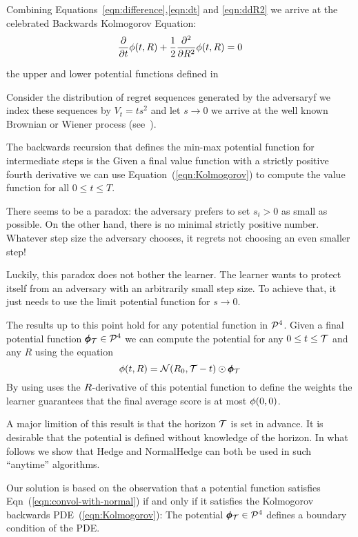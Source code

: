 \documentclass{article}[12pt]
\begin{document}
Combining Equations~\ref{eqn:difference},\ref{eqn:dt} and \ref{eqn:ddR2} we arrive at the  
 celebrated Backwards Kolmogorov Equation:
\begin{equation} \label{eqn:Kolmogorov}
  \frac{\partial}{\partial t} \phi(t,R)
  + \frac{1}{2} \frac{\partial^2}{\partial R^2} \phi(t,R)=0
\end{equation}

the upper and lower
potential functions defined in

Consider the distribution of regret sequences generated by the adversaryf we index these sequences by $V_t = ts^2$ and let $s \to 0$ we arrive at the well known Brownian or Wiener process
(see~\cite{kac1947random}).

The backwards recursion that defines the min-max potential function
for intermediate steps is the 
Given a final value function with a strictly positive fourth
derivative we can use Equation~(\ref{eqn:Kolmogorov}) to compute the
value function for all $0 \leq t \leq T$. 

There seems to be a paradox: the adversary prefers to set $s_i>0$ as
small as possible. On the other hand, there is no minimal strictly
positive number. Whatever step size the adversary chooses, it regrets
not choosing an even smaller step!

Luckily, this paradox does not bother the learner. The learner wants
to protect itself from an adversary with an arbitrarily small step
size. To achieve that, it just needs to use the limit potential function for $s \to 0$.

The results up to this point hold for any potential function in
${\cal P}^{4}$. Given a final potential function $\pmb{\phi}_{\mathcal{T}} \in {\cal P}^{4}$ we
can compute the potential for any $0 \leq t \leq \mathcal{T}$ and any $R$ using the equation 
\begin{equation} \label{eqn:convol-with-normal}
\phi(t,R)={\cal N}(R_0,\mathcal{T}-t) \odot \pmb{\phi}_{\mathcal{T}}
\end{equation}
By using uses the $R$-derivative of this potential function to define
the weights the learner guarantees that the final average score is at
most $\phi(0,0)$.

A major limition of this result is that the horizon $\mathcal{T}$ is set in
advance.  It is desirable that the potential is defined without
knowledge of the horizon.  In what follows we show that Hedge and
NormalHedge can both be used in such ``anytime'' algorithms.

Our solution is based on the observation that a potential function satisfies Eqn~(\ref{eqn:convol-with-normal}) if and only if it satisfies 
the Kolmogorov backwards PDE~(\ref{eqn:Kolmogorov}):
The potential $\pmb{\phi}_{\mathcal{T}} \in {\cal P}^{4}$ defines a boundary condition of the PDE.
\end{document}
